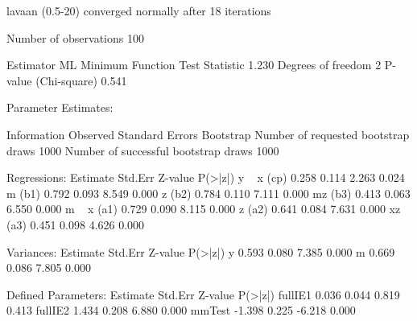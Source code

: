 \begin{Schunk}
\begin{Soutput}
lavaan (0.5-20) converged normally after  18 iterations

  Number of observations                           100

  Estimator                                         ML
  Minimum Function Test Statistic                1.230
  Degrees of freedom                                 2
  P-value (Chi-square)                           0.541

Parameter Estimates:

  Information                                 Observed
  Standard Errors                            Bootstrap
  Number of requested bootstrap draws             1000
  Number of successful bootstrap draws            1000

Regressions:
                   Estimate  Std.Err  Z-value  P(>|z|)
  y ~                                                 
    x         (cp)    0.258    0.114    2.263    0.024
    m         (b1)    0.792    0.093    8.549    0.000
    z         (b2)    0.784    0.110    7.111    0.000
    mz        (b3)    0.413    0.063    6.550    0.000
  m ~                                                 
    x         (a1)    0.729    0.090    8.115    0.000
    z         (a2)    0.641    0.084    7.631    0.000
    xz        (a3)    0.451    0.098    4.626    0.000

Variances:
                   Estimate  Std.Err  Z-value  P(>|z|)
    y                 0.593    0.080    7.385    0.000
    m                 0.669    0.086    7.805    0.000

Defined Parameters:
                   Estimate  Std.Err  Z-value  P(>|z|)
    fullIE1           0.036    0.044    0.819    0.413
    fullIE2           1.434    0.208    6.880    0.000
    mmTest           -1.398    0.225   -6.218    0.000
\end{Soutput}
\end{Schunk}
